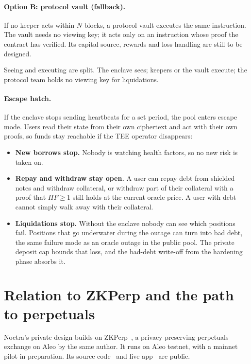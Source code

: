 \documentclass[11pt,a4paper]{article}
\begin{document}
\paragraph{Option B: protocol vault (fallback).} If no keeper acts within $N$ blocks, a protocol vault executes
the same instruction. The vault needs no viewing key; it acts only on an instruction whose proof the contract
has verified. Its capital source, rewards and loss handling are still to be designed.

Seeing and executing are split. The enclave sees; keepers or the vault execute; the protocol team holds no
viewing key for liquidations.

\paragraph{Escape hatch.} If the enclave stops sending heartbeats for a set period, the pool enters escape mode.
Users read their state from their own ciphertext and act with their own proofs, so funds stay reachable if the
TEE operator disappears:
\begin{itemize}
  \item \textbf{New borrows stop.} Nobody is watching health factors, so no new risk is taken on.
  \item \textbf{Repay and withdraw stay open.} A user can repay debt from shielded notes and withdraw collateral,
        or withdraw part of their collateral with a proof that $HF \ge 1$ still holds at the current oracle
        price. A user with debt cannot simply walk away with their collateral.
  \item \textbf{Liquidations stop.} Without the enclave nobody can see which positions fail. Positions that go
        underwater during the outage can turn into bad debt, the same failure mode as an oracle outage in the
        public pool. The private deposit cap bounds that loss, and the bad-debt write-off from the hardening
        phase absorbs it.
\end{itemize}

\section{Relation to ZKPerp and the path to perpetuals}
\label{sec:zkperp}

Noctra's private design builds on ZKPerp~\citep{zkperp}, a privacy-preserving perpetuals exchange on Aleo by the
same author. It runs on Aleo testnet, with a mainnet pilot in preparation. Its source code~\citep{zkperpcode} and live app~\citep{zkperpapp} are
public.
\end{document}
